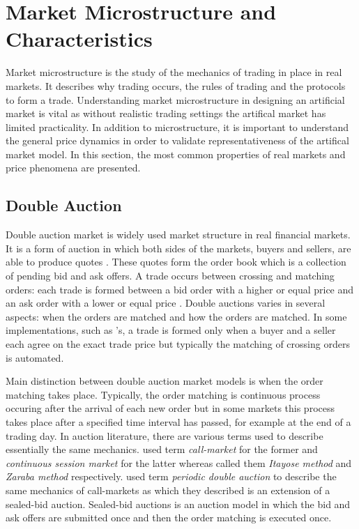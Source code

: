 \section{Market Microstructure and Characteristics}

Market microstructure is the study of the mechanics of trading in place 
in real markets. It describes why trading occurs, the rules of trading 
and the protocols to form a trade. \citep[p. 3-4]{Has07}
Understanding market microstructure in designing an artificial market
is vital as without realistic trading settings the artifical market 
has limited practicality. In addition to microstructure, it is important
to understand the general price dynamics in order to validate representativeness
of the artifical market model. In this section, the most common 
properties of real markets and price phenomena are presented. 


\subsection{Double Auction}

Double auction market is widely used market structure in real 
financial markets. It is a form of auction 
in which both sides of the markets, buyers and sellers, are able to 
produce quotes \citep*{Kle99}. These quotes form the order book 
which is a collection of pending bid and ask offers. A trade 
occurs between crossing and matching orders: each trade is formed between 
a bid order with a higher or equal price and an ask order with a lower 
or equal price \citep*{Ben12}. Double auctions varies in
several aspects: when the orders are matched and how the orders are matched. 
In some implementations, such as \citet*{God93}'s, a trade is 
formed only when a buyer and a seller each agree on the exact trade 
price but typically the matching of crossing orders is automated.


Main distinction between double auction market models is when
the order matching takes place. Typically, the order matching 
is continuous process occuring after the arrival of each new order but
in some markets this process takes place after a specified time interval
has passed, for example at the end of a trading day. \citep{boer05}
In auction literature, there are various terms used to describe essentially 
the same mechanics. \citet{boer05} used term 
\textit{call-market} for the former and \textit{continuous session market}
for the latter whereas \citet{ASt05} called them \textit{Itayose method}
and \textit{Zaraba method} respectively. \citet{Moc15} used term 
\textit{periodic double auction} to describe the same mechanics of call-markets as  which
they described is an extension of a sealed-bid auction. Sealed-bid auctions
is an auction model in which the bid and ask offers
are submitted once and then the order matching is executed once. 

